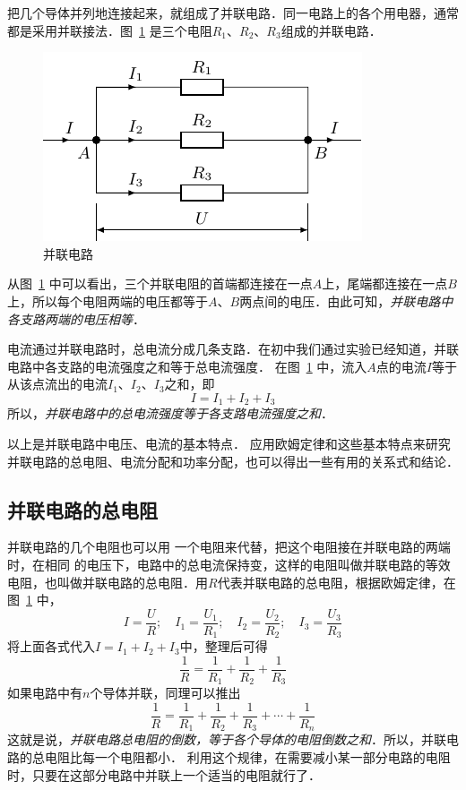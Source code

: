 把几个导体并列地连接起来，就组成了并联电路．同一电路上的各个用电器，通常都是采用并联接法．图~\ref{fig_B_7-11} 是三个电阻$R_1$、$R_2$、$R_3$组成的并联电路．

\begin{figure}[htbp]
	\centering
	\includegraphics{fig/B/7-11.pdf}
	\caption{并联电路}\label{fig_B_7-11}
\end{figure}


从图~\ref{fig_B_7-11} 中可以看出，三个并联电阻的首端都连接在一点$A$上，尾端都连接在一点$B$上，所以每个电阻两端的电压都等于$A$、$B$两点间的电压．由此可知，\textit{并联电路中各支路两端的电压相等}．

电流通过并联电路时，总电流分成几条支路．在初中我们通过实验已经知道，并联电路中各支路的电流强度之和等于总电流强度．
在图~\ref{fig_B_7-11} 中，流入$A$点的电流$I$等于从该点流出的电流$I_1$、$I_2$、$I_3$之和，即
\[I=I_1+I_2+I_3\]
所以，\textit{并联电路中的总电流强度等于各支路电流强度之和}．


以上是并联电路中电压、电流的基本特点．
应用欧姆定律和这些基本特点来研究并联电路的总电阻、电流分配和功率分配，也可以得出一些有用的关系式和结论．

\subsection{并联电路的总电阻}
并联电路的几个电阻也可以用
一个电阻来代替，把这个电阻接在并联电路的两端时，在相同
的电压下，电路中的总电流保持变，这样的电阻叫做并联电路的等效电阻，也叫做并联电路的总电阻．用$R$代表并联电路的总电阻，根据欧姆定律，在图~\ref{fig_B_7-11} 中，
\[I=\frac{U}{R};\quad I_1=\frac{U_1}{R_1};\quad I_2=\frac{U_2}{R_2};\quad I_3=\frac{U_3}{R_3}\]
将上面各式代入$I=I_1+I_2+I_3$中，整理后可得
\[\frac{1}{R}=\frac{1}{R_1}+\frac{1}{R_2}+\frac{1}{R_3} \]
如果电路中有$n$个导体并联，同理可以推出
\[\frac{1}{R}=\frac{1}{R_1}+\frac{1}{R_2}+\frac{1}{R_3}+\cdots+\frac{1}{R_n} \]
这就是说，\textit{并联电路总电阻的倒数，等于各个导体的电阻倒数之和}．所以，并联电路的总电阻比每一个电阻都小．
利用这个规律，在需要减小某一部分电路的电阻时，只要在这部分电路中并联上一个适当的电阻就行了．

